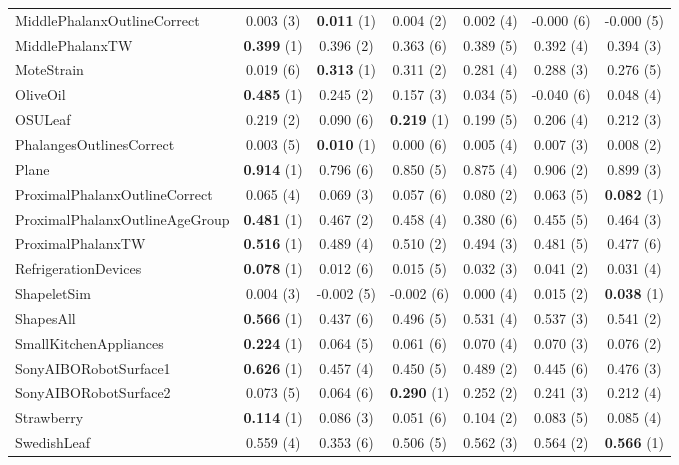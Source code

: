 \begin{table}[ht]
\begin{adjustbox}{width=\textwidth}
\begin{tabular}{lcccccc}
    MiddlePhalanxOutlineCorrect & 0.003 (3) & \textbf{0.011} (1) & 0.004 (2) & 0.002 (4) & -0.000 (6) & -0.000 (5) \\
    MiddlePhalanxTW & \textbf{0.399} (1) & 0.396 (2) & 0.363 (6) & 0.389 (5) & 0.392 (4) & 0.394 (3) \\
    MoteStrain & 0.019 (6) & \textbf{0.313} (1) & 0.311 (2) & 0.281 (4) & 0.288 (3) & 0.276 (5) \\
    OliveOil & \textbf{0.485} (1) & 0.245 (2) & 0.157 (3) & 0.034 (5) & -0.040 (6) & 0.048 (4) \\
    OSULeaf & 0.219 (2) & 0.090 (6) & \textbf{0.219} (1) & 0.199 (5) & 0.206 (4) & 0.212 (3) \\
    PhalangesOutlinesCorrect & 0.003 (5) & \textbf{0.010} (1) & 0.000 (6) & 0.005 (4) & 0.007 (3) & 0.008 (2) \\
    Plane & \textbf{0.914} (1) & 0.796 (6) & 0.850 (5) & 0.875 (4) & 0.906 (2) & 0.899 (3) \\
    ProximalPhalanxOutlineCorrect & 0.065 (4) & 0.069 (3) & 0.057 (6) & 0.080 (2) & 0.063 (5) & \textbf{0.082} (1) \\
    ProximalPhalanxOutlineAgeGroup & \textbf{0.481} (1) & 0.467 (2) & 0.458 (4) & 0.380 (6) & 0.455 (5) & 0.464 (3) \\
    ProximalPhalanxTW & \textbf{0.516} (1) & 0.489 (4) & 0.510 (2) & 0.494 (3) & 0.481 (5) & 0.477 (6) \\
    RefrigerationDevices & \textbf{0.078} (1) & 0.012 (6) & 0.015 (5) & 0.032 (3) & 0.041 (2) & 0.031 (4) \\
    ShapeletSim & 0.004 (3) & -0.002 (5) & -0.002 (6) & 0.000 (4) & 0.015 (2) & \textbf{0.038} (1) \\
    ShapesAll & \textbf{0.566} (1) & 0.437 (6) & 0.496 (5) & 0.531 (4) & 0.537 (3) & 0.541 (2) \\
    SmallKitchenAppliances & \textbf{0.224} (1) & 0.064 (5) & 0.061 (6) & 0.070 (4) & 0.070 (3) & 0.076 (2) \\
    SonyAIBORobotSurface1 & \textbf{0.626} (1) & 0.457 (4) & 0.450 (5) & 0.489 (2) & 0.445 (6) & 0.476 (3) \\
    SonyAIBORobotSurface2 & 0.073 (5) & 0.064 (6) & \textbf{0.290} (1) & 0.252 (2) & 0.241 (3) & 0.212 (4) \\
    Strawberry & \textbf{0.114} (1) & 0.086 (3) & 0.051 (6) & 0.104 (2) & 0.083 (5) & 0.085 (4) \\
    SwedishLeaf & 0.559 (4) & 0.353 (6) & 0.506 (5) & 0.562 (3) & 0.564 (2) & \textbf{0.566} (1) \\

\end{tabular}
\end{adjustbox}
\end{table}
